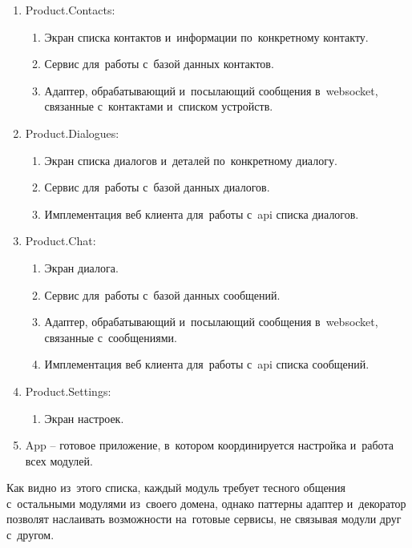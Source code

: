 \begin{enumerate}
	\item Product.Contacts:
	\begin{enumerate}
		\item Экран списка контактов и~информации по~конкретному контакту.
		\item Сервис для~работы с~базой данных контактов.
		\item Адаптер, обрабатывающий и~посылающий сообщения в~websocket, связанные с~контактами и~списком устройств.
	\end{enumerate}

	\item Product.Dialogues:
	\begin{enumerate}
		\item Экран списка диалогов и~деталей по~конкретному диалогу.
		\item Сервис для~работы с~базой данных диалогов.
		\item Имплементация веб клиента для~работы с~\gls{api} списка диалогов.
	\end{enumerate}

	\item Product.Chat:
	\begin{enumerate}
		\item Экран диалога.
		\item Сервис для~работы с~базой данных сообщений.
		\item Адаптер, обрабатывающий и~посылающий сообщения в~websocket, связанные с~сообщениями.
		\item Имплементация веб клиента для~работы с~\gls{api} списка сообщений.
	\end{enumerate}

	\item Product.Settings:
	\begin{enumerate}
		\item Экран настроек.
	\end{enumerate}

	\item App -- готовое приложение, в~котором координируется настройка и~работа всех модулей.

\end{enumerate}

Как видно из~этого списка, каждый модуль требует тесного общения с~остальными модулями из~своего домена, однако паттерны адаптер и~декоратор позволят наслаивать возможности на~готовые сервисы, не связывая модули друг с~другом.